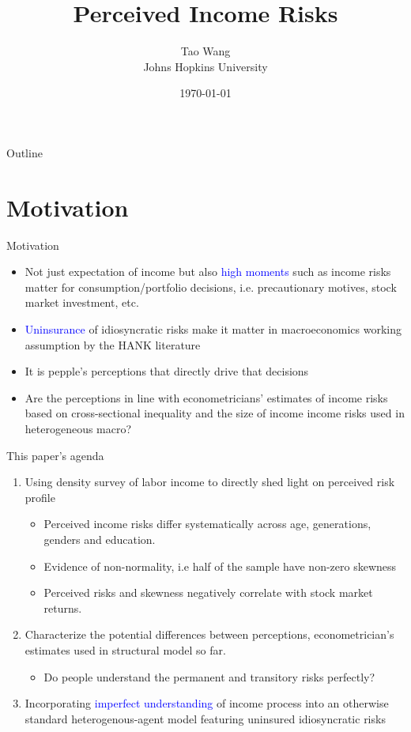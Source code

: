 \documentclass{beamer}
\title{Perceived Income Risks}
\author{Tao Wang \\ Johns Hopkins University}
\date{\today}
\begin{document}
	

\begin{frame}
	\titlepage
\end{frame}
\begin{frame}{Outline}
	\tableofcontents
\end{frame}


\section{Motivation}

\begin{frame}{Motivation}
	\begin{itemize}
		\item Not just expectation of income but also \textcolor{blue}{high moments} such as income risks matter for consumption/portfolio decisions, i.e. precautionary motives, stock market investment, etc. 
		\item \textcolor{blue}{Uninsurance} of idiosyncratic risks make it matter in macroeconomics working assumption by the HANK literature  
		\item It is pepple's perceptions that directly drive that decisions
		\item Are the perceptions in line with econometricians' estimates of income risks based on cross-sectional inequality and the size of income income risks used in heterogeneous macro?
	\end{itemize}
\end{frame}


\begin{frame}{This paper's agenda}
	\begin{enumerate}
		\item Using density survey of labor income to directly shed light on perceived risk profile
		\begin{itemize}
			\item Perceived income risks differ systematically across age, generations, genders and education. 
			\item Evidence of non-normality, i.e half of the sample have non-zero skewness
			\item Perceived risks and skewness negatively correlate with stock market returns.  
		\end{itemize}
		\item Characterize the potential differences between perceptions, econometrician's estimates used in structural model so far. 
		\begin{itemize}
		    \item Do people understand the permanent and transitory risks perfectly?
		\end{itemize}
		\item Incorporating \textcolor{blue}{imperfect understanding} of income process into an otherwise standard heterogenous-agent model featuring uninsured idiosyncratic risks 
\end{enumerate}
\end{frame}
\end{document}
